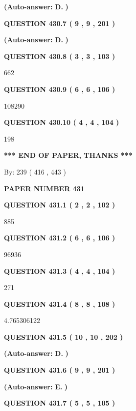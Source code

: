 \documentclass{ctexart}
\begin{document}
 
{\textbf{(Auto-answer:}}
{\textbf{\large{
D.}}}
{\textbf{)}}
 
 
  
  
{\textbf{\large{QUESTION
430.7 
 ( 9 , 9 , 201 )
}}}
 
 
{\textbf{(Auto-answer:}}
{\textbf{\large{
D.}}}
{\textbf{)}}
 
 
  
  
{\textbf{\large{QUESTION
430.8 
 ( 3 , 3 , 103 )
}}}

662
  
  
{\textbf{\large{QUESTION
430.9 
 ( 6 , 6 , 106 )
}}}

108290
  
  
{\textbf{\large{QUESTION
430.10 
 ( 4 , 4 , 104 )
}}}

198
   
   
   
   
\vspace{1.0in} 
{\textbf{\large{ *** END OF PAPER, THANKS *** }}} 
   
   
\hspace{1.0in} By: 
 239 ( 416 ,  443 )
   
   
   
   
\newpage 
\setcounter{page}{ 
   431001 } 
   
   
 {\textbf{ \Large{ PAPER NUMBER  431  }}}
   
   
   
   
  
  
{\textbf{\large{QUESTION
431.1 
 ( 2 , 2 , 102 )
}}}

885
  
  
{\textbf{\large{QUESTION
431.2 
 ( 6 , 6 , 106 )
}}}

96936
  
  
{\textbf{\large{QUESTION
431.3 
 ( 4 , 4 , 104 )
}}}

271
  
  
{\textbf{\large{QUESTION
431.4 
 ( 8 , 8 , 108 )
}}}

4.765306122
  
  
{\textbf{\large{QUESTION
431.5 
 ( 10 , 10 , 202 )
}}}
 
 
{\textbf{(Auto-answer:}}
{\textbf{\large{
D.}}}
{\textbf{)}}
 
 
  
  
{\textbf{\large{QUESTION
431.6 
 ( 9 , 9 , 201 )
}}}
 
 
{\textbf{(Auto-answer:}}
{\textbf{\large{
E.}}}
{\textbf{)}}
 
 
  
  
{\textbf{\large{QUESTION
431.7 
 ( 5 , 5 , 105 )
}}}
\end{document}
